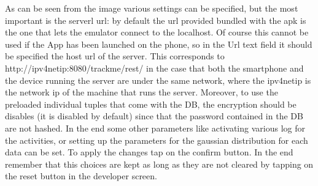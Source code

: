 As can be seen from the image various settings can be specified, but the most important is the serverl url: by default the url provided bundled with the apk is the one that lets the emulator connect to the localhost. Of course this cannot be used if the App has been launched on the phone, so in the Url text field it should be specified the host url of the server. This corresponds  to http://ipv4netip:8080/trackme/rest/ in the case that both the smartphone and the device running the server are under the same network, where the ipv4netip is the network ip of the machine that runs the server.
Moreover, to use the preloaded individual tuples that come with the DB, the encryption should be disables (it is disabled by default) since that the password contained in the DB are not hashed.
In the end some other parameters like activating various log for the activities, or setting up the parameters for the gaussian distribution for each data can be set.
To apply the changes tap on the confirm button.
In the end remember that this choices are kept as long as they are not cleared by tapping on the reset button in the developer screen.



